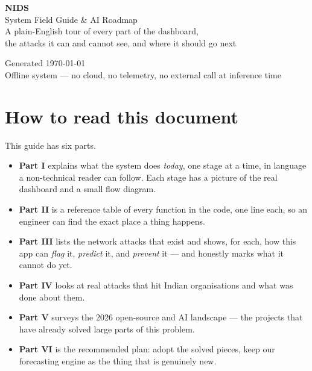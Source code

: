 \documentclass[11pt,a4paper]{article}
\begin{document}
\begin{titlepage}
\centering
\vspace*{2.5cm}
{\Huge\bfseries NIDS}\\[6pt]
{\LARGE System Field Guide \& AI Roadmap}\\[18pt]
{\large A plain-English tour of every part of the dashboard,\\
the attacks it can and cannot see, and where it should go next}\\[2cm]
\vfill
{\small Generated \today\\ Offline system --- no cloud, no telemetry, no external call at inference time}
\end{titlepage}

\tableofcontents
\clearpage

\section*{How to read this document}

This guide has six parts.

\begin{itemize}
\item \textbf{Part I} explains what the system does \emph{today}, one stage at a
  time, in language a non-technical reader can follow. Each stage has a picture
  of the real dashboard and a small flow diagram.
\item \textbf{Part II} is a reference table of every function in the code, one
  line each, so an engineer can find the exact place a thing happens.
\item \textbf{Part III} lists the network attacks that exist and shows, for each,
  how this app can \emph{flag} it, \emph{predict} it, and \emph{prevent} it ---
  and honestly marks what it cannot do yet.
\item \textbf{Part IV} looks at real attacks that hit Indian organisations and
  what was done about them.
\item \textbf{Part V} surveys the 2026 open-source and AI landscape --- the
  projects that have already solved large parts of this problem.
\item \textbf{Part VI} is the recommended plan: adopt the solved pieces, keep our
  forecasting engine as the thing that is genuinely new.
\end{itemize}
\end{document}
